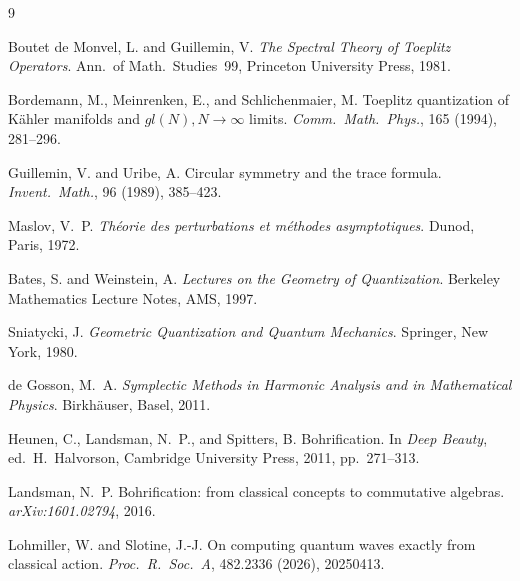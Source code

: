 \documentclass[11pt]{article}
\begin{document}
\begin{thebibliography}{9}

Boutet de Monvel, L. and Guillemin, V.
\textit{The Spectral Theory of Toeplitz Operators}.
Ann.\ of Math.\ Studies~99, Princeton University Press, 1981.

Bordemann, M., Meinrenken, E., and Schlichenmaier, M.
Toeplitz quantization of K\"ahler manifolds and $gl(N), N\to\infty$ limits.
\textit{Comm.\ Math.\ Phys.}, 165 (1994), 281--296.

Guillemin, V. and Uribe, A.
Circular symmetry and the trace formula.
\textit{Invent.\ Math.}, 96 (1989), 385--423.

Maslov, V.~P.
\textit{Th\'eorie des perturbations et m\'ethodes asymptotiques}.
Dunod, Paris, 1972.

Bates, S. and Weinstein, A.
\textit{Lectures on the Geometry of Quantization}.
Berkeley Mathematics Lecture Notes, AMS, 1997.

Sniatycki, J.
\textit{Geometric Quantization and Quantum Mechanics}.
Springer, New York, 1980.

de Gosson, M.~A.
\textit{Symplectic Methods in Harmonic Analysis and in Mathematical Physics}.
Birkh{\"a}user, Basel, 2011.

Heunen, C., Landsman, N.~P., and Spitters, B.
Bohrification.
In \textit{Deep Beauty}, ed.\ H.~Halvorson,
Cambridge University Press, 2011, pp.~271--313.

Landsman, N.~P.
Bohrification: from classical concepts to commutative algebras.
\textit{arXiv:1601.02794}, 2016.

Lohmiller, W. and Slotine, J.-J.
On computing quantum waves exactly from classical action.
\textit{Proc.\ R.\ Soc.\ A}, 482.2336 (2026), 20250413.

\end{thebibliography}
\end{document}
